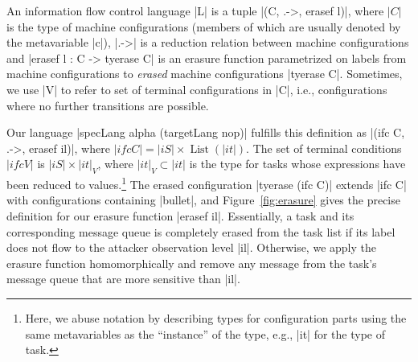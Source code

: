 \begin{definition}
    An information flow control language |L| is a tuple |(C, .->,
    erasef l)|, where $|C|$ is the type of machine configurations (members
    of which are usually denoted by the metavariable |c|), |.->| is a
    reduction relation between machine configurations and |erasef l : C -> tyerase C|
    is an erasure function parametrized on labels from machine configurations to \emph{erased} machine
    configurations |tyerase C|.  Sometimes, we use |V| to refer to set of
     terminal configurations in |C|, i.e., configurations where
     no further transitions are possible.
\end{definition}

Our language |specLang alpha (targetLang nop)| fulfills
this definition as |(ifc C, .->, erasef il)|, where
$|ifc C| = |iS| \times \operatorname{List}(|it|)$.  The set of terminal conditions
$|ifc V|$ is $|iS| \times |it|_V$, where $|it|_V \subset |it|$ is the
type for tasks whose expressions have been reduced to
values.\footnote{
  Here, we abuse notation by describing types for configuration parts using the
  same metavariables as the ``instance'' of the type, e.g., |it| for the type of
  task.
}
The erased configuration |tyerase (ifc C)| extends |ifc C| with configurations
containing |bullet|, and Figure~\ref{fig:erasure} gives the precise definition for
our erasure function |erasef il|.
%
Essentially, a task and its corresponding message queue is completely erased from the task
list if its label does not flow to the attacker observation level |il|.
Otherwise, we apply the erasure function homomorphically and remove any message
from the task's message queue that are more sensitive than |il|.


